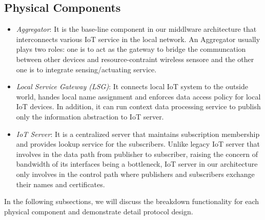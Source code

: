 \subsection{Physical Components}\label{sec:physical}
\begin{itemize}
\item{\em Aggregator}:
It is the base-line component in our middlware architecture that interconnects various IoT service in the local network. An Aggregator usually plays two roles: one is to act as the gateway to bridge the communcation between other devices and resource-contraint wireless sensore and the other one is to integrate sensing/actuating service. 


\item{\em Local Service Gateway (LSG)}:
It connects local IoT system to the outside world, handes local name assignment and enforces  data access policy for local IoT devices. In addition, it can run context data processing service to publish only the information abstraction to IoT server.

\item{\em IoT Server}:
It is a centralized server that maintains subscription membership and provides lookup service for the subscribers. Unlike legacy IoT server that involves in the data path from publisher to subscriber, raising the concern of bandwidth of its interfaces being a bottleneck, IoT server in our architecture only involves in the control path where publishers and subscribers exchange their names and certificates.  

\end{itemize}

In the following subsections, we will discuss the breakdown functionality for each  physical component and demonstrate detail protocol design.

